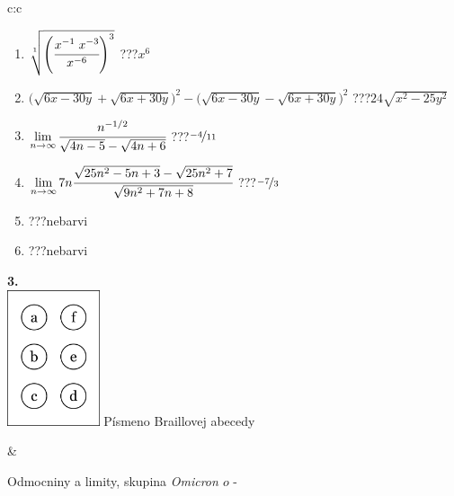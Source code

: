 \documentclass[10pt]{report}
\newcommand\omicron{o}
\begin{document}
\begin{tabular}{c:c}
\begin{minipage}[c][104.5mm][t]{0.5\linewidth}
\begin{center}
\begin{minipage}{0.79\linewidth}
\begin{center}
\begin{varwidth}{\linewidth}
\begin{enumerate}
\small
\item $\sqrt[1]{\left(\cfrac{x^{-1}\;x^{-3}}{x^{-6}}\right)^{3}}$\quad \dotfill\; ???\;\dotfill \quad $x^{6}$
\item {\footnotesize{\scriptsize$\big(\sqrt{6x-30y}+\sqrt{6x+30y}\big)^2-\big(\sqrt{6x-30y}-\sqrt{6x+30y}\big)^2$}\quad \dotfill\; ???\;\dotfill \quad $24\sqrt{x^2-25y^2}$}
\item $\lim\limits_{n\to\infty}\cfrac{n^{-1/2}}{\sqrt{4n-5}-\sqrt{4n+6}}$\quad \dotfill\; ???\;\dotfill \quad $\nicefrac{-4}{11}$
\item $\lim\limits_{n\to\infty}7n\cfrac{\sqrt{25n^2-5n+3}-\sqrt{25n^2+7}}{\sqrt{9n^2+7n+8}}$\quad \dotfill\; ???\;\dotfill \quad $\nicefrac{-7}{3}$
\item \quad \dotfill\; ???\;\dotfill \quad nebarvi
\item \quad \dotfill\; ???\;\dotfill \quad nebarvi
\end{enumerate}
\end{varwidth}
\end{center}
\end{minipage}
\begin{minipage}{0.20\linewidth}
\begin{center}
{\Huge\bfseries 3.} \\[2mm]
\includegraphics[height=40mm]{../images/braille.png}
{\small Písmeno Braillovej abecedy}
\end{center}
\end{minipage}
\end{center}
\end{minipage}
&
\begin{minipage}[c][104.5mm][t]{0.5\linewidth}
\begin{center}
\vspace{7mm}
{\huge Odmocniny a limity, skupina \textit{Omicron $\omicron$} -}\\[5mm]

\end{center}
\end{minipage}
\end{tabular}
\end{document}
